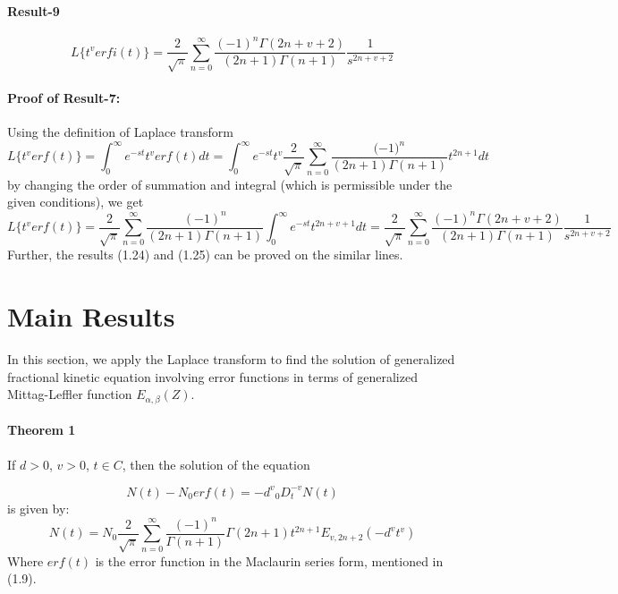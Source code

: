 \documentclass{article}
\begin{document}
\paragraph{Result-9}
\begin{equation}
    L\big\{{t^v}erfi(t)\big\} = 
    \frac{2}{\sqrt{\pi}}
    \sum_{n = 0}^{\infty}
    \frac{{(-1)}^n\Gamma{(2n+v+2)}}{(2n+1)\Gamma{(n+1)}}
    \frac{1}{s^{2n+v+2}}
\end{equation}
\paragraph{Proof of Result-7:}
Using the definition of Laplace transform
\begin{equation*}
    L \big\{ {t^v}erf(t) \big\}=
    \int_0^{\infty}
    e ^{-st}{t^v}erf(t)dt = 
    \int_0^{\infty}
    e ^{-st}t^{v}
    \frac{2}{\sqrt{\pi}}
    \sum_{n = 0}^{\infty}
    \frac{({-1)}^n}{(2n+1)\Gamma{(n+1)}}
    t^{2n+1}dt
\end{equation*}
by changing the order of summation and integral (which is permissible under the given conditions), we get
\begin{equation*}
    L \big\{{t^v} erf(t) \big\}=
    \frac{2}{\sqrt{\pi}}
    \sum_{n = 0}^{\infty}
    \frac{{(-1)}^n}{(2n+1)\Gamma{(n+1)}}
    \int_0^{\infty}
    e ^{-st}t^{2n+v+1}dt =
    \frac{2}{\sqrt{\pi}}
    \sum_{n = 0}^{\infty}
    \frac{{(-1)}^n\Gamma{(2n+v+2)}}{(2n+1)\Gamma{(n+1)}}
    \frac{1}{s^{2n+v+2}}
\end{equation*}
Further, the results (1.24) and (1.25) can be proved on the similar lines.
\section{Main Results}
In this section, we apply the Laplace transform to find the solution of generalized fractional kinetic equation involving error functions in terms of generalized Mittag-Leffler function $E_{{\alpha}, {\beta}}(Z)$.
\paragraph{Theorem 1}
If $d > 0$, $v > 0$, $t \in C$, then the solution of the equation

\begin{equation}
    N(t) - N_0erf(t) = {-d^v}{_0D_t^{-v}}N(t)
\end{equation}
is given by:
\begin{equation}
    N(t) = N_0
    \frac{2}{\sqrt{\pi}}\sum_{n = 0}^{\infty}
    \frac{(-1)^n}{\Gamma{(n+1)}}
    \Gamma{(2n+1)}t^{2n+1}
    E_{v,2n+2}
    ({-d^v}{t^v})
\end{equation}
Where $erf(t)$ is the error function in the Maclaurin series form, mentioned in (1.9).
\end{document}
